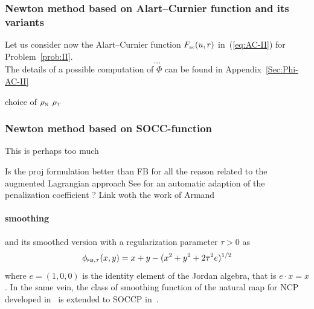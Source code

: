 \subsubsection{Newton method based on Alart--Curnier function and its variants}
\label{Sec:NSN-AC}
Let us consider now the Alart--Curnier function $F_{{\hbox{\tiny{ac}}}}(u,r)$ in~(\ref{eq:AC-II}) for Problem~\ref{prob:II}.
\begin{equation}
  \label{eq:phiphi-AC}
   \ldots
\end{equation}
The details of a possible computation of $\Phi$ can be found in Appendix~\ref{Sec:Phi-AC-II}

\begin{ndrva}
  choice of $\rho_{\hbox{\tiny{N}}}$ $\rho_{\hbox{\tiny{T}}}$
\end{ndrva}



\subsubsection{Newton method based on  SOCC-function}
\label{Sec:Num-SOCCP}


\begin{ndrva}
  This is perhaps  too much
\end{ndrva}


\begin{ndrva}
  Is the proj formulation better than FB for all the reason related to the augmented Lagrangian approach
  See \cite{Mirar.Arora_SMO2004-I} for an automatic adaption of the penalization coefficient ? Link woth the work of Armand
\end{ndrva}



\paragraph{smoothing}
and its smoothed version with a regularization parameter $\tau>0$ as
\begin{equation}
  \label{eq:Jordan-FB-smoothed}
  \phi_{\fb, \tau}(x,y) = x+y - (x^2 + y^2 + 2 \tau^2 e)^{1/2}
\end{equation}
where $e = (1,0,0)$ is the identity element of the Jordan algebra, that is $e \cdot x =x$. In the same vein, the class of smoothing function of the natural map for NCP developed in~\cite{Chen.Mangasarian1996} is extended to SOCCP in~\cite{Fukushima.ea2001}.



